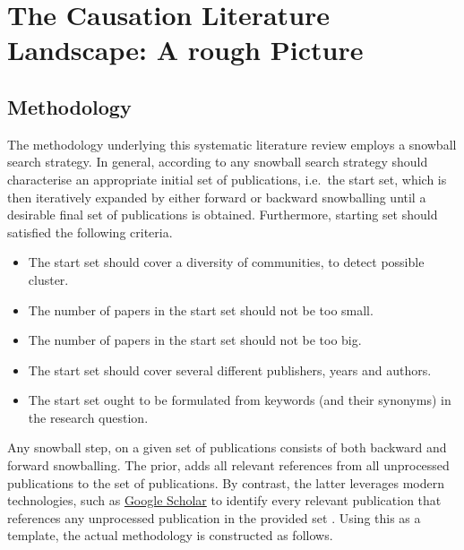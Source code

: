 \documentclass[11pt,a4paper]{book}
\theoremstyle{definition}
\theoremstyle{definition}
\theoremstyle{definition}
\theoremstyle{remark}
\begin{document}
\chapter{The Causation Literature Landscape: A rough Picture}

\section{Methodology}
\label{sec:methodology}
The methodology underlying this systematic literature review employs a snowball search strategy. 
In general, according to \parencite{wohlin2014guidelines} any snowball search strategy should characterise an appropriate initial set of publications, i.e.\ the start set, which is then iteratively expanded by either forward or backward snowballing until a desirable final set of publications is obtained.
Furthermore, starting set should satisfied the following criteria.
\begin{itemize}
\item The start set should cover a diversity of communities, to detect possible cluster.
\item The number of papers in the start set should not be too small.
\item The number of papers in the start set should not be too big.
\item The start set should cover several different publishers, years and authors.
\item The start set ought to be formulated from keywords (and their synonyms) in the research question.
\end{itemize}
Any snowball step, on a given set of publications consists of both backward and forward snowballing.
The prior, adds all relevant references from all unprocessed publications to the set of publications. By contrast, the latter leverages modern technologies, such as \href{https://scholar.google.at/}{Google Scholar} to identify every relevant publication that references any unprocessed publication in the provided set \parencite{wohlin2014guidelines}.
Using this as a template, the actual methodology is constructed as follows.
\end{document}

